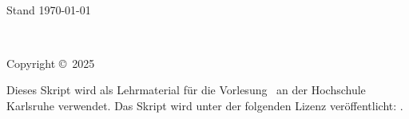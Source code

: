 \documentclass[11pt,fleqn, oneside]{book} %
\date{\today}
\begin{document}
\createTikZTitlePage{\scriptFaculty}   
{{\huge\textbf{\scriptTitle\\}}{Stand \today}}   
{\scriptAuthor}


\newpage
~\vfill
\thispagestyle{empty}

\noindent Copyright \copyright\ 2025 \scriptAuthor %


\noindent {\url{\scriptWebsite}} %

\noindent
Dieses Skript wird als Lehrmaterial für die Vorlesung \scriptCourse\ an der Hochschule Karlsruhe verwendet.
Das Skript wird unter der folgenden Lizenz veröffentlicht: \scriptLicense.

\noindent \textit{\scriptEdition} %




\pagestyle{empty} %

\tableofcontents %

\cleardoublepage %

\pagestyle{fancy} %




\end{document}
